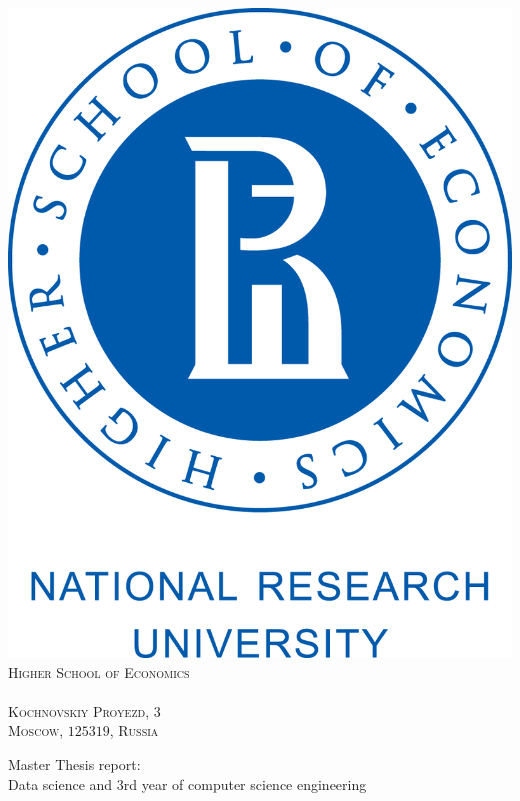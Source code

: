 \begin{titlepage}
\begin{minipage}{0.5\textwidth}
\begin{flushright}
            \vspace{-25mm}
            \includegraphics[scale = 0.1]{Pictures/HSE.png}
            \textsc{\vspace{1.2em} \small \\ Higher School of Economics \\}
            \textsc{\small \\ Kochnovskiy Proyezd, $3$ \\}
            \textsc{\small Moscow, $125319$, Russia \\}
            
        \end{flushright}
    \end{minipage}
    
    \vspace{25mm}

    \begin{center}
    
        
        Master Thesis report: \\
        Data science and 3rd year of computer science 
        engineering \\
        

\end{center}
\end{titlepage}
